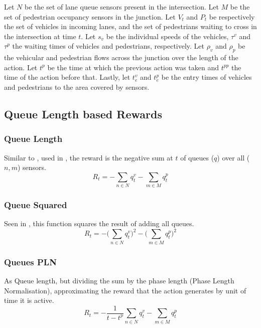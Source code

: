 \documentclass[conference]{IEEEtran}
\begin{document}
Let $N$ be the set of lane queue sensors present in the intersection.
Let $M$ be the set of pedestrian occupancy sensors in the junction.
Let $V_t$ and $P_t$ be respectively the set of vehicles in incoming lanes, and the set of pedestrians waiting to cross in the intersection at time $t$. 
Let $s_v$ be the individual speeds of the vehicles, $\tau^v$ and $\tau^p$ the waiting times of vehicles and pedestrians, respectively.
Let $\rho_v$ and $\rho_p$ be the vehicular and pedestrian flows across the junction over the length of the action.
Let $t^p$ be the time at which the previous action was taken and $t^{pp}$ the time of the action before that.
Lastly, let $t^v_e$ and $t^p_e$ be the entry times of vehicles and pedestrians to the area covered by sensors. 

\subsection{Queue Length based Rewards}
\subsubsection{Queue Length}
Similar to \cite{pra2010}, used in \cite{aslani2019}, the reward is the negative sum at $t$ of queues ($q$) over all ($n,m$) sensors.
\begin{equation}
    R_t = - \sum_{n \in N} q^v_{t} - \sum_{m \in M} q^p_{t}
\label{eq:queue}
\end{equation}

\subsubsection{Queue Squared}
Seen in \cite{gendersthesis}, this function squares the result of adding all queues.
\begin{equation}
   R_t = -  \bigg( \sum_{n \in N} q^v_{t} \bigg)^2 - \bigg( \sum_{m \in M} q^p_{t} \bigg)^2
\label{eq:queuesq} 
\end{equation}

\subsubsection{Queues PLN}
As Queue length, but dividing the sum by the phase length (Phase Length Normalisation), approximating the reward that the action generates by unit of time it is active.
\begin{equation}
    R_t = - \frac{1}{t-t^p}  \sum_{n \in N} q^v_{t} -  \sum_{m \in M} q^p_{t}
    \label{queuepln}
\end{equation}
\end{document}
